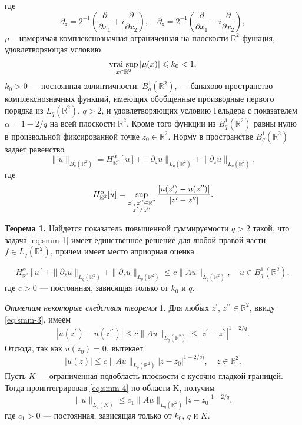 	где 
	$$
	\partial_{\bar{z}}=2^{-1}\left(\frac{\partial}{\partial x_1}+i\frac{\partial}{\partial x_2}\right),\quad \partial_{z}=2^{-1}\left(\frac{\partial}{\partial x_1}-i\frac{\partial}{\partial x_2}\right),
	$$
	 $\mu$ – измеримая комплекснозначная ограниченная на плоскости $\mathbb{R}^2$ функция, удовлетворяющая условию
\begin{equation}\label{eq:smm-2}
\mathop{\rm vrai\ sup}_{x\in \mathbb{R}^2} |\mu(x)|\leqslant k_0<1,
\end{equation}      
	$k_0>0$ –-- постоянная эллиптичности.
	$B_q^1 (\mathbb{R}^2)$, --– банахово пространство комплекснозначных функций, имеющих обобщенные производные первого порядка из $L_q (\mathbb{R}^2)$, $q>2$, и удовлетворяющих условию Гельдера с показателем $\alpha=1-2/q$  на всей плоскости $\mathbb{R}^2$. Кроме того функции из $B_q^1 (\mathbb{R}^2)$ равны нулю в произвольной фиксированной точке $z_0\in \mathbb{R}^2$. Норму в пространстве $B_q^1 (\mathbb{R}^2)$ задает равенство
	$$\|u\|_{B_q^1 (\mathbb{R}^2)}=H_{\mathbb{R}^2}^\alpha [u]+\|\partial_{\bar{z} }u\|_{L_q (\mathbb{R}^2)}+\|\partial_z u\|_{L_q (\mathbb{R}^2)},$$
	где
	$$H_{{\mathbb{R}^2}}^\alpha [u]=\mathop{\rm sup}\limits_{\substack {z^\prime,\, z^{\prime\prime}\in\mathbb{R}^2\\z^\prime\ne z^{\prime\prime}}}\frac{|u(z^\prime
		)-u(z^{\prime\prime})|}{|z^\prime-z^{\prime\prime}|}.$$
	
	\textbf{Теорема 1.} Найдется показатель повышенной суммируемости $q>2$ такой, что задача \eqref{eq:smm-1} имеет единственное решение для любой правой части $f\in L_q(\mathbb{R}^2)$, причем имеет место априорная оценка 

\begin{equation}\label{eq:smm-3}
H_{\mathbb{R}^2}^\alpha [u]+\|\partial_{\bar{z} }u\|_{L_q (\mathbb{R}^2)}+\|\partial_z u\|_{L_q (\mathbb{R}^2)}\leqslant c\|Au\|_{L_q(\mathbb{R}^2)}, \quad u\in B_q^1({\mathbb R}^2),
\end{equation}
	где $c >0$ –-- постоянная, зависящая только от $k_0$ и $q$. 
	
	\textit{Отметим некоторые следствия теоремы} 1. Для любых  $z^\prime$, $z^{\prime\prime}\in {\mathbb R}^2$, ввиду \eqref{eq:smm-3}, имеем
	$$|u(z^\prime)-u(z^{\prime\prime})| \leqslant c\|Au\|_{L_q ({\mathbb R}^2) }\leqslant |z^\prime-z^{\prime\prime}|^{1-2/q}.$$
	Отсюда, так как $u(z_0 )=0$, вытекает
	\begin{equation}\label{eq:smm-4}
|u(z)|\leqslant c\|Au\|_{L_q ({\mathbb R}^2 )} |z-z_0 |^{1-2/q)},\quad z\in {\mathbb R}^2.
\end{equation}                           
	Пусть $K$ –-- ограниченная подобласть плоскости с кусочно гладкой границей. Тогда проинтегрировав \eqref{eq:smm-4} по области K, получим
\begin{equation*}%
\|u\|_{L_q (K) }\leqslant c_1 \|Au\|_{L_q ({\mathbb R}^2 )}|z-z_0|^{1-2/q}, 
\end{equation*}                                      
	где $c_1>0$ –-- постоянная, зависящая только от $k_0$, $q$ и $K$.

